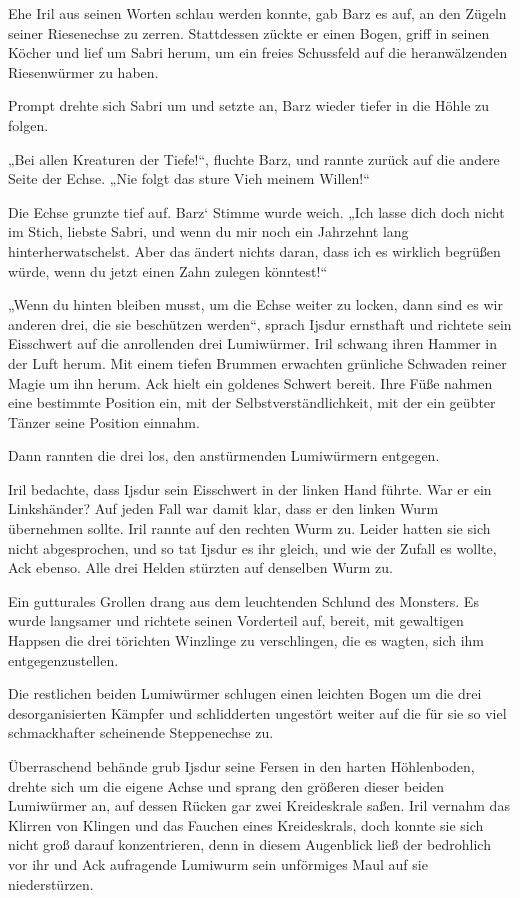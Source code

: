 Ehe Iril aus seinen Worten schlau werden konnte, gab Barz es auf, an den Zügeln seiner Riesenechse zu zerren. Stattdessen zückte er einen Bogen, griff in seinen Köcher und lief um Sabri herum, um ein freies Schussfeld auf die heranwälzenden Riesenwürmer zu haben.

Prompt drehte sich Sabri um und setzte an, Barz wieder tiefer in die Höhle zu folgen.

„Bei allen Kreaturen der Tiefe!“, fluchte Barz, und rannte zurück auf die andere Seite der Echse. „Nie folgt das sture Vieh meinem Willen!“

Die Echse grunzte tief auf. Barz‘ Stimme wurde weich. „Ich lasse dich doch nicht im Stich, liebste Sabri, und wenn du mir noch ein Jahrzehnt lang hinterherwatschelst. Aber das ändert nichts daran, dass ich es wirklich begrüßen würde, wenn du jetzt einen Zahn zulegen könntest!“

„Wenn du hinten bleiben musst, um die Echse weiter zu locken, dann sind es wir anderen drei, die sie beschützen werden“, sprach Ijsdur ernsthaft und richtete sein Eisschwert auf die anrollenden drei Lumiwürmer. Iril schwang ihren Hammer in der Luft herum. Mit einem tiefen Brummen erwachten grünliche Schwaden reiner Magie um ihn herum. Ack hielt ein goldenes Schwert bereit. Ihre Füße nahmen eine bestimmte Position ein, mit der Selbstverständlichkeit, mit der ein geübter Tänzer seine Position einnahm.

Dann rannten die drei los, den anstürmenden Lumiwürmern entgegen.

Iril bedachte, dass Ijsdur sein Eisschwert in der linken Hand führte. War er ein Linkshänder? Auf jeden Fall war damit klar, dass er den linken Wurm übernehmen sollte. Iril rannte auf den rechten Wurm zu. Leider hatten sie sich nicht abgesprochen, und so tat Ijsdur es ihr gleich, und wie der Zufall es wollte, Ack ebenso. Alle drei Helden stürzten auf denselben Wurm zu.

Ein gutturales Grollen drang aus dem leuchtenden Schlund des Monsters. Es wurde langsamer und richtete seinen Vorderteil auf, bereit, mit gewaltigen Happsen die drei törichten Winzlinge zu verschlingen, die es wagten, sich ihm entgegenzustellen.

Die restlichen beiden Lumiwürmer schlugen einen leichten Bogen um die drei desorganisierten Kämpfer und schlidderten ungestört weiter auf die für sie so viel schmackhafter scheinende Steppenechse zu.

Überraschend behände grub Ijsdur seine Fersen in den harten Höhlenboden, drehte sich um die eigene Achse und sprang den größeren dieser beiden Lumiwürmer an, auf dessen Rücken gar zwei Kreideskrale saßen. Iril vernahm das Klirren von Klingen und das Fauchen eines Kreideskrals, doch konnte sie sich nicht groß darauf konzentrieren, denn in diesem Augenblick ließ der bedrohlich vor ihr und Ack aufragende Lumiwurm sein unförmiges Maul auf sie niederstürzen.

